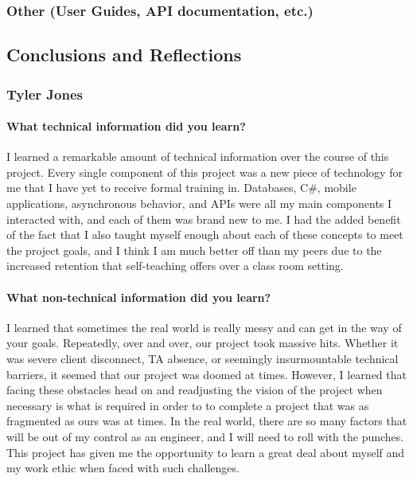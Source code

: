 \documentclass{article}
\begin{document}
\subsubsection{Other (User Guides, API documentation, etc.)}
\subsection{Conclusions and Reflections}
\subsubsection{Tyler Jones}
\paragraph{What technical information did you learn?}
I learned a remarkable amount of technical information over the course of this project. Every single component of this project was a new piece of technology for me that I have yet to receive formal training in. Databases, C#, mobile applications, asynchronous behavior, and APIs were all my main components I interacted with, and each of them was brand new to me. I had the added benefit of the fact that I also taught myself enough about each of these concepts to meet the project goals, and I think I am much better off than my peers due to the increased retention that self-teaching offers over a class room setting.
\paragraph{What non-technical information did you learn?}
I learned that sometimes the real world is really messy and can get in the way of your goals. Repeatedly, over and over, our project took massive hits. Whether it was severe client disconnect, TA absence, or seemingly insurmountable technical barriers, it seemed that our project was doomed at times. However, I learned that facing these obstacles head on and readjusting the vision of the project when necessary is what is required in order to to complete a project that was as fragmented as ours was at times. In the real world, there are so many factors that will be out of my control as an engineer, and I will need to roll with the punches. This project has given me the opportunity to learn a great deal about myself and my work ethic when faced with such challenges.
\end{document}
